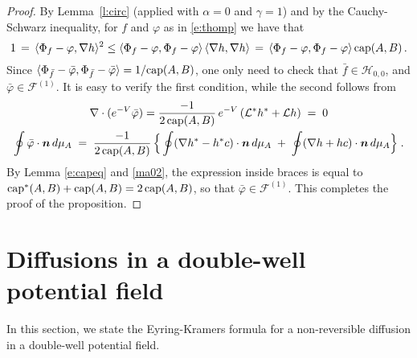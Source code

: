 \documentclass[reqno]{amsart}
\newcounter{as}[section]
\newcommand{\mc}[1]{{\mathcal #1}}
\newcommand{\bs}[1]{{\boldsymbol #1}}
\newcommand{\<}{\langle}
\renewcommand{\>}{\rangle}
\renewcommand{\Cap}{{\rm cap}}
\begin{document}
\begin{proof}
By Lemma~\ref{l:circ} (applied with $\alpha=0$ and $\gamma=1$) and by
the Cauchy-Schwarz inequality, for $f$ and $\varphi$ as in \eqref{e:thomp} we
have that
\begin{equation*}
1\,=\, \langle \Phi_f-\varphi,\nabla h\rangle^2
\le \langle \Phi_f-\varphi,\Phi_f-\varphi\rangle \,
\langle \nabla h, \nabla h\rangle
\,=\, \langle \Phi_f-\varphi,\Phi_f-\varphi\rangle \,
\Cap(A,B)\, .
\end{equation*}
Since $\langle \Phi_{\bar f}-\bar \varphi,\Phi_{\bar f}-\bar
\varphi\rangle = 1/\Cap(A,B)$, one only need to check that $\bar f\in
\mc H_{0,0}$, and $\bar \varphi \in \mc F^{(1)}$. It is easy to verify the
first condition, while the second follows from
\begin{gather*}
\nabla \cdot (e^{-V} \bar \varphi)
=\frac{-1}{2\, \Cap(A,B)} \, e^{-V} \left( \mc L^* h^* +\mc L h\right)
\;=\;0  \\
\oint \bar \varphi \cdot \bs n\, d\mu_A \;=\;
\frac{-1}{2\, \Cap(A,B)} \, \Big\{
\oint (\nabla h^* - h^* c) \cdot \bs n\, d\mu_A
\;+\; \oint (\nabla h + h c) \cdot \bs n\, d\mu_A \Big\}\;.
\end{gather*}
By Lemma \ref{e:capeq} and \eqref{ma02}, the expression inside braces
is equal to $\Cap^*(A,B)+\Cap(A,B)= 2 \, \Cap(A,B)$, so that $\bar
\varphi \in \mc F^{(1)}$. This completes the proof of the proposition.
\end{proof}

\section{Diffusions in a double-well potential field}
\label{sec3}

In this section, we state the Eyring-Kramers formula for a
non-reversible diffusion in a double-well potential field.
\end{document}
